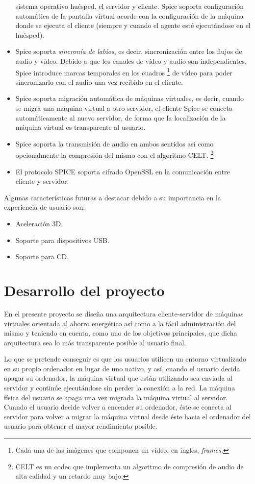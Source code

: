 \documentclass[spanisheDIVcalc,twoside,parskip-,pointlessnumbers,final]{scrbook}
\newcommand{\clearemptydoublepage}{\newpage{\pagestyle{empty}\cleardoublepage}}
\begin{document}
\begin{itemize}
sistema operativo huésped, el servidor y cliente. Spice soporta configuración
automática de la pantalla virtual acorde con la configuración de la
máquina donde se ejecuta el cliente (siempre y cuando el agente esté
ejecutándose en el huésped).
\item Spice soporta \emph{sincronía de labios}, es decir, sincronización
entre los flujos de audio y vídeo. Debido a que los canales de vídeo
y audio son independientes, Spice introduce marcas temporales en los
cuadros%
\footnote{Cada una de las imágenes que componen un vídeo, en inglés, \emph{frames.}%
} de vídeo para poder sincronizarlo con el audio una vez recibido en
el cliente.
\item Spice soporta migración automática de máquinas virtuales, es decir,
cuando se migra una máquina virtual a otro servidor, el cliente Spice
se conecta automáticamente al nuevo servidor, de forma que la localización
de la máquina virtual es transparente al usuario.
\item Spice soporta la transmisión de audio en ambos sentidos así como opcionalmente
la compresión del mismo con el algoritmo CELT.%
\footnote{CELT es un codec que implementa un algoritmo de compresión de audio
de alta calidad y un retardo muy bajo.%
}
\item El protocolo SPICE soporta cifrado OpenSSL en la comunicación entre
cliente y servidor.
\end{itemize}
Algunas características futuras a destacar debido a su importancia
en la experiencia de usuario son:
\begin{itemize}
\item Aceleración 3D.
\item Soporte para dispositivos USB.
\item Soporte para CD.
\end{itemize}

\clearemptydoublepage
\chapter{Desarrollo del proyecto}

En el presente proyecto se diseña una arquitectura cliente-servidor
de máquinas virtuales orientada al ahorro energético así como a la
fácil administración del mismo y teniendo en cuenta, como uno de los
objetivos principales, que dicha arquitectura sea lo más transparente
posible al usuario final.

Lo que se pretende conseguir es que los usuarios utilicen un entorno
virtualizado en su propio ordenador en lugar de uno nativo, y así,
cuando el usuario decida apagar su ordenador, la máquina virtual que
están utilizando sea enviada al servidor y continúe ejecutándose sin
perder la conexión a la red. La máquina física del usuario se apaga
una vez migrada la máquina virtual al servidor. Cuando el usuario
decide volver a encender su ordenador, éste se conecta al servidor
para volver a migrar la máquina virtual desde éste hacia el ordenador
del usuario para obtener el mayor rendimiento posible.
\end{document}
